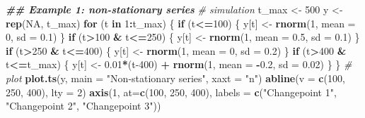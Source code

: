 \documentclass[
]{book}
\newenvironment{Shaded}{\begin{snugshade}}{\end{snugshade}}
\newcommand{\AttributeTok}[1]{\textcolor[rgb]{0.13,0.29,0.53}{#1}}
\newcommand{\CommentTok}[1]{\textcolor[rgb]{0.56,0.35,0.01}{\textit{#1}}}
\newcommand{\ConstantTok}[1]{\textcolor[rgb]{0.56,0.35,0.01}{#1}}
\newcommand{\ControlFlowTok}[1]{\textcolor[rgb]{0.13,0.29,0.53}{\textbf{#1}}}
\newcommand{\DecValTok}[1]{\textcolor[rgb]{0.00,0.00,0.81}{#1}}
\newcommand{\DocumentationTok}[1]{\textcolor[rgb]{0.56,0.35,0.01}{\textbf{\textit{#1}}}}
\newcommand{\FloatTok}[1]{\textcolor[rgb]{0.00,0.00,0.81}{#1}}
\newcommand{\FunctionTok}[1]{\textcolor[rgb]{0.13,0.29,0.53}{\textbf{#1}}}
\newcommand{\NormalTok}[1]{#1}
\newcommand{\OtherTok}[1]{\textcolor[rgb]{0.56,0.35,0.01}{#1}}
\newcommand{\SpecialCharTok}[1]{\textcolor[rgb]{0.81,0.36,0.00}{\textbf{#1}}}
\newcommand{\StringTok}[1]{\textcolor[rgb]{0.31,0.60,0.02}{#1}}
\begin{document}
\begin{Shaded}
\begin{Highlighting}[]
\DocumentationTok{\#\# Example 1: non{-}stationary series}
\CommentTok{\# simulation}
\NormalTok{t\_max }\OtherTok{\textless{}{-}} \DecValTok{500}
\NormalTok{y }\OtherTok{\textless{}{-}} \FunctionTok{rep}\NormalTok{(}\ConstantTok{NA}\NormalTok{, t\_max)}
\ControlFlowTok{for}\NormalTok{ (t }\ControlFlowTok{in} \DecValTok{1}\SpecialCharTok{:}\NormalTok{t\_max) \{}
  \ControlFlowTok{if}\NormalTok{ (t}\SpecialCharTok{\textless{}=}\DecValTok{100}\NormalTok{) \{}
\NormalTok{    y[t] }\OtherTok{\textless{}{-}} \FunctionTok{rnorm}\NormalTok{(}\DecValTok{1}\NormalTok{, }\AttributeTok{mean =} \DecValTok{0}\NormalTok{, }\AttributeTok{sd =} \FloatTok{0.1}\NormalTok{)}
\NormalTok{  \}}
  \ControlFlowTok{if}\NormalTok{ (t}\SpecialCharTok{\textgreater{}}\DecValTok{100} \SpecialCharTok{\&}\NormalTok{ t}\SpecialCharTok{\textless{}=}\DecValTok{250}\NormalTok{) \{}
\NormalTok{    y[t] }\OtherTok{\textless{}{-}} \FunctionTok{rnorm}\NormalTok{(}\DecValTok{1}\NormalTok{, }\AttributeTok{mean =} \FloatTok{0.5}\NormalTok{, }\AttributeTok{sd =} \FloatTok{0.1}\NormalTok{)}
\NormalTok{  \}}
  \ControlFlowTok{if}\NormalTok{ (t}\SpecialCharTok{\textgreater{}}\DecValTok{250} \SpecialCharTok{\&}\NormalTok{ t}\SpecialCharTok{\textless{}=}\DecValTok{400}\NormalTok{) \{}
\NormalTok{    y[t] }\OtherTok{\textless{}{-}} \FunctionTok{rnorm}\NormalTok{(}\DecValTok{1}\NormalTok{, }\AttributeTok{mean =} \DecValTok{0}\NormalTok{, }\AttributeTok{sd =} \FloatTok{0.2}\NormalTok{)}
\NormalTok{  \}}
  \ControlFlowTok{if}\NormalTok{ (t}\SpecialCharTok{\textgreater{}}\DecValTok{400} \SpecialCharTok{\&}\NormalTok{ t}\SpecialCharTok{\textless{}=}\NormalTok{t\_max) \{}
\NormalTok{    y[t] }\OtherTok{\textless{}{-}} \FloatTok{0.01}\SpecialCharTok{*}\NormalTok{(t}\DecValTok{{-}400}\NormalTok{) }\SpecialCharTok{+} \FunctionTok{rnorm}\NormalTok{(}\DecValTok{1}\NormalTok{, }\AttributeTok{mean =} \SpecialCharTok{{-}}\FloatTok{0.2}\NormalTok{, }\AttributeTok{sd =} \FloatTok{0.02}\NormalTok{)}
\NormalTok{  \}}
\NormalTok{\}}
\CommentTok{\# plot}
\FunctionTok{plot.ts}\NormalTok{(y, }\AttributeTok{main =} \StringTok{"Non{-}stationary series"}\NormalTok{, }\AttributeTok{xaxt =} \StringTok{"n"}\NormalTok{)}
\FunctionTok{abline}\NormalTok{(}\AttributeTok{v =} \FunctionTok{c}\NormalTok{(}\DecValTok{100}\NormalTok{, }\DecValTok{250}\NormalTok{, }\DecValTok{400}\NormalTok{), }\AttributeTok{lty =} \DecValTok{2}\NormalTok{)}
\FunctionTok{axis}\NormalTok{(}\DecValTok{1}\NormalTok{, }\AttributeTok{at=}\FunctionTok{c}\NormalTok{(}\DecValTok{100}\NormalTok{, }\DecValTok{250}\NormalTok{, }\DecValTok{400}\NormalTok{),}
     \AttributeTok{labels =} \FunctionTok{c}\NormalTok{(}\StringTok{"Changepoint 1"}\NormalTok{, }\StringTok{"Changepoint 2"}\NormalTok{, }\StringTok{"Changepoint 3"}\NormalTok{))}
\end{Highlighting}
\end{Shaded}
\end{document}
